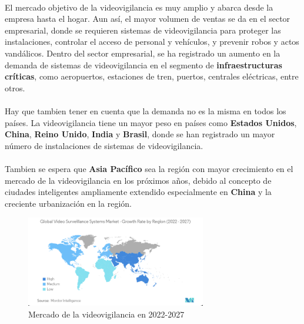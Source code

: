 \documentclass{report}
\begin{document}
        \paragraph*{}
        {
          El mercado objetivo de la videovigilancia es muy amplio y abarca desde la empresa hasta el hogar. 
          Aun así, el mayor volumen de ventas se da en el sector empresarial, donde se requieren sistemas de videovigilancia para proteger las instalaciones, controlar el acceso de personal y vehículos, y prevenir robos y actos vandálicos.
          Dentro del sector empresarial, se ha registrado un aumento en la demanda de sistemas de videovigilancia en el segmento de \textbf{infraestructuras críticas}, como aeropuertos, estaciones de tren, puertos, centrales eléctricas, entre otros.\cite{mordor-video-surveillance}
        }
        \paragraph*{}
        {
          Hay que tambien tener en cuenta que la demanda no es la misma en todos los países. La videovigilancia tiene un mayor peso en países como \textbf{Estados Unidos}, \textbf{China}, \textbf{Reino Unido}, \textbf{India} y \textbf{Brasil}, donde se han registrado un mayor número de instalaciones de sistemas de videovigilancia.\cite{mordor-video-surveillance}
        }
        \paragraph*{}
        {
          Tambien se espera que \textbf{Asia Pacífico} sea la región con mayor crecimiento en el mercado de la videovigilancia en los próximos años, debido al concepto de ciudades inteligentes ampliamente extendido especialmente en \textbf{China} y la creciente urbanización en la región.\cite{mordor-video-surveillance} \cite{bbc-videovigilancia} \cite{elpais-videovigilancia}
        }
        \begin{figure}[H]
          \centering
          \includegraphics[width=0.7\textwidth]{./img/ssm.png}
          \caption{Mercado de la videovigilancia en 2022-2027}
        \end{figure}   
\end{document}
